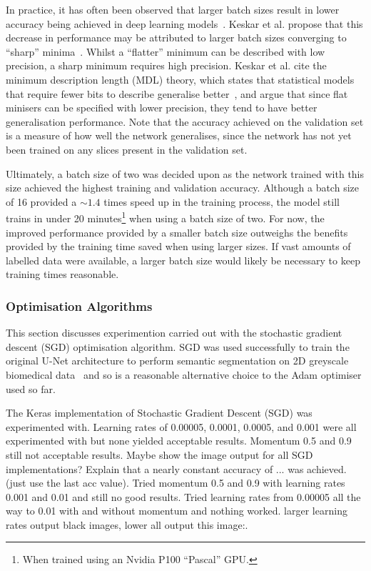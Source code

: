 In practice, it has often been observed that larger batch sizes result in lower accuracy being achieved in deep learning models~\cite{keskar2016large, smallbatch, largebatch}. Keskar et al. propose that this decrease in performance may be attributed to larger batch sizes converging to ``sharp'' minima~\cite{keskar2016large}. Whilst a ``flatter'' minimum can be described with low precision, a sharp minimum requires high precision. Keskar et al. cite the minimum description length (MDL) theory, which states that statistical models that require fewer bits to describe generalise better~\cite{rissanen}, and argue that since flat minisers can be specified with lower precision, they tend to have better generalisation performance. Note that the accuracy achieved on the validation set is a measure of how well the network generalises, since the network has not yet been trained on any slices present in the validation set.

Ultimately, a batch size of two was decided upon as the network trained with this size achieved the highest training and validation accuracy. Although a batch size of 16 provided a ${\sim}1.4$ times speed up in the training process, the model still trains in under 20 minutes\footnote{When trained using an Nvidia P100 ``Pascal'' GPU.} when using a batch size of two. For now, the improved performance provided by a smaller batch size outweighs the benefits provided by the training time saved when using larger sizes. If vast amounts of labelled data were available, a larger batch size would likely be necessary to keep training times reasonable.

\subsubsection{Optimisation Algorithms}

This section discusses experimention carried out with the stochastic gradient descent (SGD) optimisation algorithm. SGD was used successfully to train the original U-Net architecture to perform semantic segmentation on 2D greyscale biomedical data~\cite{ronneberger2015u} and so is a reasonable alternative choice to the Adam optimiser used so far.

The Keras implementation of Stochastic Gradient Descent (SGD) was experimented with. Learning rates of 0.00005, 0.0001, 0.0005, and 0.001 were all experimented with but none yielded acceptable results. Momentum 0.5 and 0.9 still not acceptable results. Maybe show the image output for all SGD implementations? Explain that a nearly constant accuracy of ... was achieved. (just use the last acc value). Tried momentum 0.5 and 0.9 with learning rates 0.001 and 0.01 and still no good results. Tried learning rates from 0.00005 all the way to 0.01 with and without momentum and nothing worked. larger learning rates output black images, lower all output this image:.

